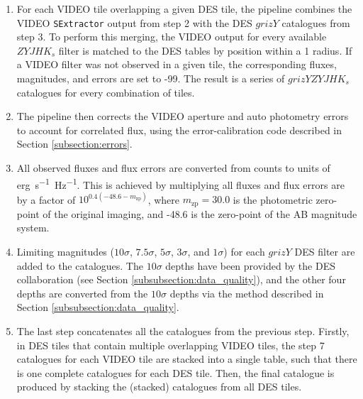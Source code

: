 \begin{enumerate}
    \item For each VIDEO tile overlapping a given DES tile, the pipeline combines the VIDEO \texttt{SExtractor} output from step 2 with the DES $grizY$ catalogues from step 3. To perform this merging, the VIDEO output for every available $ZYJHK_{s}$ filter is matched to the DES tables by position within a \SI{1}{\arcsec} radius. If a VIDEO filter was not observed in a given tile, the corresponding fluxes, magnitudes, and errors are set to -99. The result is a series of $grizYZYJHK_{s}$ \DESVIDEO catalogues for every combination of \DESVIDEO tiles. 
    
    \item The pipeline then corrects the VIDEO aperture and auto photometry errors to account for correlated flux, using the error-calibration code described in Section \ref{subsection:errors}. 
    
    \item All observed fluxes and flux errors are converted from counts to units of \si{erg.s^{-1}.Hz^{-1}}. This is achieved by multiplying all fluxes and flux errors are by a factor of $10^{0.4(-48.6-m_{\mathrm{zp}})}$, where $m_{\mathrm{zp}}=30.0$ is the photometric zero-point of the original imaging, and -48.6 is the zero-point of the AB magnitude system. 
    
    
    \item Limiting magnitudes ($10\sigma$, $7.5\sigma$, $5\sigma$, $3\sigma$, and $1\sigma$) for each $grizY$ DES filter are added to the catalogues. The $10\sigma$ depths have been provided by the DES collaboration (see Section \ref{subsubsection:data_quality}), and the other four depths are converted from the $10\sigma$ depths via the method described in Section \ref{subsubsection:data_quality}.
    
    \item The last step concatenates all the catalogues from the previous step. Firstly, in DES tiles that contain multiple overlapping VIDEO tiles, the step 7 catalogues for each VIDEO tile are stacked into a single table, such that there is one complete catalogues for each DES tile. Then, the final \DESVIDEO catalogue is produced by stacking the (stacked) catalogues from all DES tiles. 
\end{enumerate}

